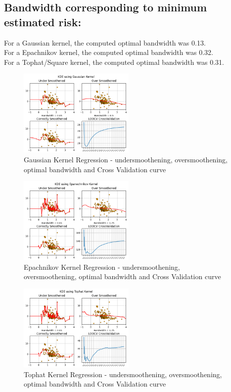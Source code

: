 \subsection{Bandwidth corresponding to minimum estimated risk: }
For a Gaussian kernel, the computed optimal bandwidth was 0.13.\\
For a Epachnikov kernel, the computed optimal bandwidth was 0.32.\\
For a Tophat/Square kernel, the computed optimal bandwidth was 0.31.
\begin{figure}[H]
    \centering
    \includegraphics[width=0.5\textwidth]{../q4/gaussian_kernel_regression.png}
    \caption{Gaussian Kernel Regression - undersmoothening, oversmoothening, optimal bandwidth and Cross Validation curve}
    \label{fig:q4_1}
\end{figure}
\begin{figure}[H]
    \centering
    \includegraphics[width=0.5\textwidth]{../q4/epanechnikov_kernel_regression.png}
    \caption{Epachnikov Kernel Regression - undersmoothening, oversmoothening, optimal bandwidth and Cross Validation curve}
    \label{fig:q4_2}
\end{figure}
\begin{figure}[H]
    \centering
    \includegraphics[width=0.5\textwidth]{../q4/tophat_kernel_regression.png}
    \caption{Tophat Kernel Regression - undersmoothening, oversmoothening, optimal bandwidth and Cross Validation curve}
    \label{fig:q4_3}
\end{figure}
